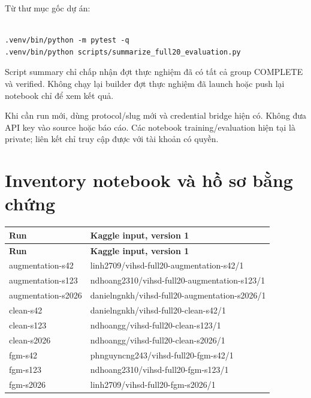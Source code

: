 \documentclass[11pt,a4paper]{article}
\newlength{\reporttablewidth}
\begin{document}
Từ thư mục gốc dự án:


\begin{Verbatim}[fontsize=\footnotesize]

.venv/bin/python -m pytest -q
.venv/bin/python scripts/summarize_full20_evaluation.py

\end{Verbatim}

Script summary chỉ chấp nhận đợt thực nghiệm đã có tất cả group COMPLETE và verified. Không chạy lại builder đợt thực nghiệm đã launch hoặc push lại notebook chỉ để xem kết quả.


Khi cần run mới, dùng protocol/slug mới và credential bridge hiện có. Không đưa API key vào source hoặc báo cáo. Các notebook training/evaluation hiện tại là private; liên kết chỉ truy cập được với tài khoản có quyền.


\FloatBarrier\section{Inventory notebook và hồ sơ bằng chứng}

\begingroup
\small
\setlength{\tabcolsep}{4pt}
\setlength{\reporttablewidth}{\dimexpr\linewidth-2\tabcolsep\relax}
\renewcommand{\arraystretch}{1.15}
\begin{longtable}{@{}>{\raggedright\arraybackslash}p{0.31000\reporttablewidth}>{\raggedright\arraybackslash}p{0.69000\reporttablewidth}@{}}
\toprule
\textbf{Run} & \textbf{Kaggle input, version 1} \\
\midrule
\endfirsthead
\toprule
\textbf{Run} & \textbf{Kaggle input, version 1} \\
\midrule
\endhead
\bottomrule
\endlastfoot
augmentation-s42 & linh2709/vihsd-full20-augmentation-s42/1 \\
augmentation-s123 & ndhoang2310/vihsd-full20-augmentation-s123/1 \\
augmentation-s2026 & danielngnkh/vihsd-full20-augmentation-s2026/1 \\
clean-s42 & danielngnkh/vihsd-full20-clean-s42/1 \\
clean-s123 & ndhoangg/vihsd-full20-clean-s123/1 \\
clean-s2026 & ndhoangg/vihsd-full20-clean-s2026/1 \\
fgm-s42 & phnguyncng243/vihsd-full20-fgm-s42/1 \\
fgm-s123 & ndhoang2310/vihsd-full20-fgm-s123/1 \\
fgm-s2026 & linh2709/vihsd-full20-fgm-s2026/1 \\
\end{longtable}
\endgroup
\end{document}
